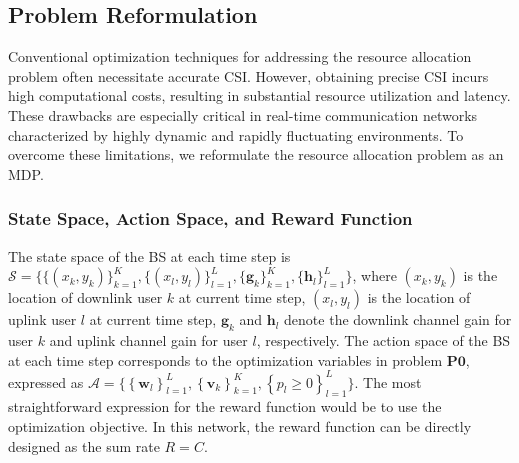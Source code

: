 \documentclass[comsoc,journal]{IEEEtran}
\begin{document}
\subsection{Problem Reformulation}
Conventional optimization techniques for addressing the resource allocation problem often necessitate accurate CSI. However, obtaining precise CSI incurs high computational costs, resulting in substantial resource utilization and latency. These drawbacks are especially critical in real-time communication networks characterized by highly dynamic and rapidly fluctuating environments. To overcome these limitations, we reformulate the resource allocation problem as an MDP.
\subsubsection{State Space, Action Space, and Reward Function}
The state space of the BS at each time step is $\mathcal{S} = \{\{\left(x_k,y_k\right)\}_{k=1}^{K}, \{\left(x_l,y_l\right)\}_{l=1}^{L}, \{\mathbf{g}_k\}_{k=1}^{K}, \{\mathbf{h}_l\}_{l=1}^{L}\}$, where $(x_k, y_k)$ is the location of downlink user $k$ at current time step, $(x_l, y_l)$ is the location of uplink user $l$ at current time step, $\mathbf{g}_k$ and $\mathbf{h}_l$ denote the downlink channel gain for user $k$ and uplink channel gain for user $l$, respectively. 
The action space of the BS at each time step corresponds to the optimization variables in problem $\textbf{P0}$, expressed as $\mathcal{A} = \{\left\{ \mathbf{w}_l \right\}_{l=1}^{L}, \left\{ \mathbf{v}_k \right\}_{k=1}^{K}, \left\{ p_l \geq 0 \right\}_{l=1}^{L}\}
$. 
The most straightforward expression for the reward function would be to use the optimization objective. In this network, the reward function can be directly designed as the sum rate $R=C$.

\end{document}
